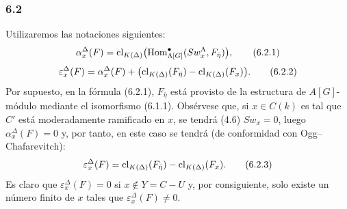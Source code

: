 \subsubsection*{6.2}

Utilizaremos las notaciones siguientes:
\[
\alpha_x^\Delta(F)
=
\operatorname{cl}_{K(\Delta)}\bigl(\operatorname{Hom}^\bullet_{\Lambda[G]}(Sw_x^\Lambda,F_{\bar\eta})\bigr),
\tag{6.2.1}
\]
\[
\varepsilon_x^\Delta(F)
=
\alpha_x^\Delta(F)+
\bigl(\operatorname{cl}_{K(\Delta)}(F_{\bar\eta})-\operatorname{cl}_{K(\Delta)}(F_x)\bigr).
\tag{6.2.2}
\]
Por supuesto, en la fórmula (6.2.1), $F_{\bar\eta}$ está provisto de la estructura de $A[G]$-módulo mediante el isomorfismo (6.1.1). Obsérvese que, si $x\in C(k)$ es tal que $C'$ está moderadamente ramificado en $x$, se tendrá (4.6) $Sw_x=0$, luego $\alpha_x^\Delta(F)=0$ y, por tanto, en este caso se tendrá (de conformidad con Ogg--Chafarevitch):
\[
\varepsilon_x^\Delta(F)=\operatorname{cl}_{K(\Delta)}(F_{\bar\eta})-\operatorname{cl}_{K(\Delta)}(F_x).
\tag{6.2.3}
\]
Es claro que $\varepsilon_x^\Delta(F)=0$ si $x\notin Y=C-U$ y, por consiguiente, solo existe un número finito de $x$ tales que $\varepsilon_x^\Delta(F)\ne0$.
